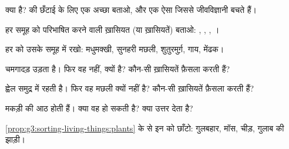 \begin{exercise}[$\star$]\label{exo:g3:sorting-living-things:1}
 क्या है?  की छँटाई के लिए एक अच्छा  बताओ, और एक ऐसा
जिससे जीवविज्ञानी बचते हैं।
\end{exercise}

\begin{exercise}[$\star$]\label{exo:g3:sorting-living-things:2}
हर समूह को परिभाषित करने वाली ख़ासियत (या ख़ासियतें) बताओ: ,
, , ।
\end{exercise}

\begin{exercise}[$\star$]\label{exo:g3:sorting-living-things:3}
हर  को उसके समूह में रखो: मधुमक्खी, सुनहरी मछली, शुतुरमुर्ग़, गाय,
मेंढक।
\end{exercise}

\begin{exercise}[$\star$]\label{exo:g3:sorting-living-things:4}
चमगादड़ उड़ता है। फिर वह  नहीं,  क्यों है? कौन-सी
ख़ासियतें फ़ैसला करती हैं?
\end{exercise}

\begin{exercise}[$\star$]\label{exo:g3:sorting-living-things:5}
ह्वेल समुद्र में रहती है। फिर वह मछली क्यों नहीं है? कौन-सी ख़ासियतें
फ़ैसला करती हैं?
\end{exercise}

\begin{exercise}[$\star$]\label{exo:g3:sorting-living-things:6}
मकड़ी की आठ  होती हैं। क्या वह  हो सकती है?  क्या उत्तर
देता है?
\end{exercise}

\begin{exercise}[$\star$]\label{exo:g3:sorting-living-things:7}
\cref{prop:g3:sorting-living-things:plants} के  से इन  को
छाँटो: गुलबहार, मॉस, चीड़, गुलाब की झाड़ी।
\end{exercise}

